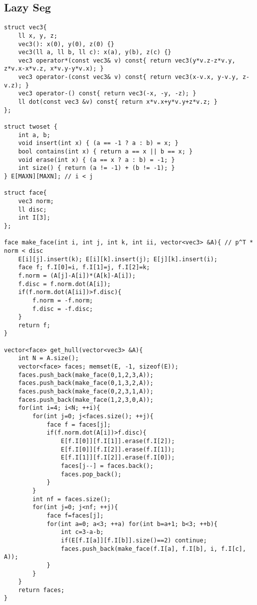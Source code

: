 \documentclass[landscape, 8pt, a4paper, oneside, twocolumn]{extarticle}
\begin{document}
\subsection{Lazy Seg}
\begin{verbatim}
struct vec3{
	ll x, y, z;
	vec3(): x(0), y(0), z(0) {}
	vec3(ll a, ll b, ll c): x(a), y(b), z(c) {}
	vec3 operator*(const vec3& v) const{ return vec3(y*v.z-z*v.y, z*v.x-x*v.z, x*v.y-y*v.x); }
	vec3 operator-(const vec3& v) const{ return vec3(x-v.x, y-v.y, z-v.z); }
	vec3 operator-() const{ return vec3(-x, -y, -z); }
	ll dot(const vec3 &v) const{ return x*v.x+y*v.y+z*v.z; }
};

struct twoset {
	int a, b;
	void insert(int x) { (a == -1 ? a : b) = x; }
	bool contains(int x) { return a == x || b == x; }
	void erase(int x) { (a == x ? a : b) = -1; }
	int size() { return (a != -1) + (b != -1); }
} E[MAXN][MAXN]; // i < j

struct face{
	vec3 norm;
	ll disc;
	int I[3];
};

face make_face(int i, int j, int k, int ii, vector<vec3> &A){ // p^T * norm < disc
	E[i][j].insert(k); E[i][k].insert(j); E[j][k].insert(i);
	face f; f.I[0]=i, f.I[1]=j, f.I[2]=k;
	f.norm = (A[j]-A[i])*(A[k]-A[i]);
	f.disc = f.norm.dot(A[i]);
	if(f.norm.dot(A[ii])>f.disc){
		f.norm = -f.norm;
		f.disc = -f.disc;
	}
	return f;
}

vector<face> get_hull(vector<vec3> &A){
	int N = A.size();
	vector<face> faces; memset(E, -1, sizeof(E));
	faces.push_back(make_face(0,1,2,3,A));
	faces.push_back(make_face(0,1,3,2,A));
	faces.push_back(make_face(0,2,3,1,A));
	faces.push_back(make_face(1,2,3,0,A));
	for(int i=4; i<N; ++i){
		for(int j=0; j<faces.size(); ++j){
			face f = faces[j];
			if(f.norm.dot(A[i])>f.disc){
				E[f.I[0]][f.I[1]].erase(f.I[2]);
				E[f.I[0]][f.I[2]].erase(f.I[1]);
				E[f.I[1]][f.I[2]].erase(f.I[0]);
				faces[j--] = faces.back();
				faces.pop_back();
			}
		}
		int nf = faces.size();
		for(int j=0; j<nf; ++j){
			face f=faces[j];
			for(int a=0; a<3; ++a) for(int b=a+1; b<3; ++b){
				int c=3-a-b;
				if(E[f.I[a]][f.I[b]].size()==2) continue;
				faces.push_back(make_face(f.I[a], f.I[b], i, f.I[c], A));
			}
		}
	}
	return faces;
}
\end{verbatim}
\end{document}
